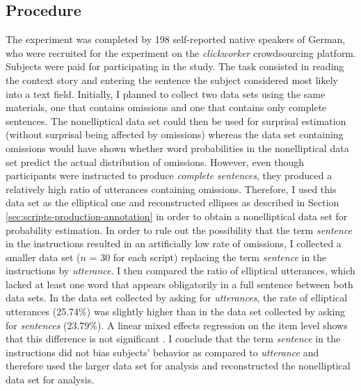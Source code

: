 \subsection{Procedure}
The experiment was completed by 198 self-reported native speakers of German, who were recruited for the experiment on the \textit{clickworker} crowdsourcing platform. Subjects were paid  for participating in the study. The task consisted in reading the context story and entering the sentence the subject considered most likely into a text field. Initially, I planned to collect two data sets using the same materials, one that contains omissions and one that contains only complete sentences. The nonelliptical data set could then be used for surprisal estimation (without surprisal being affected by omissions) whereas the data set containing omissions would have shown whether word probabilities in the nonelliptical data set predict the actual distribution of omissions. However, even though participants were instructed to produce \textit{complete sentences}, they produced a relatively high ratio of utterances containing omissions. Therefore, I used this data set as the elliptical one and reconstructed ellipses as described in Section \ref{sec:scripts-production-annotation} in order to obtain a nonelliptical data set for probability estimation. In order to rule out the possibility that the term \textit{sentence} in the instructions resulted in an artificially low rate of omissions, I collected a smaller data set ($n$ = 30 for each script) replacing the term \textit{sentence} in the instructions by \textit{utterance}. I then compared the ratio of elliptical utterances, which lacked at least one word that appears obligatorily in a full sentence between both data sets. In the data set collected by asking for \textit{utterances}, the rate of elliptical utterances (25.74\%) was slightly higher than in the data set collected by asking for \textit{sentences} (23.79\%). A linear mixed effects regression on the item level shows that this difference is not significant . I conclude that the term \textit{sentence} in the instructions did not bias subjects' behavior as compared to \textit{utterance} and therefore used the larger data set for analysis and reconstructed the nonelliptical data set for analysis.

